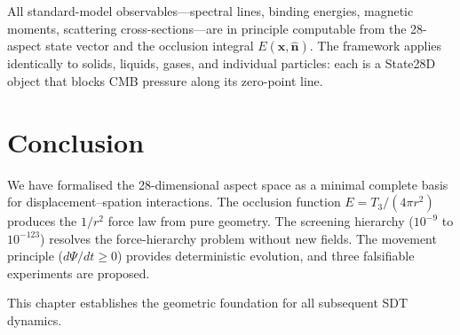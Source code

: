 All standard-model observables---spectral lines, binding energies, magnetic moments, scattering cross-sections---are in principle computable from the 28-aspect state vector and the occlusion integral $E(\mathbf{x},\hat{\mathbf{n}})$.  The framework applies identically to solids, liquids, gases, and individual particles: each is a State28D object that blocks CMB pressure along its zero-point line.


\section{Conclusion}

We have formalised the 28-dimensional aspect space as a minimal complete basis for displacement--spation interactions.  The occlusion function $E = T_3/(4\pi r^2)$ produces the $1/r^2$ force law from pure geometry.  The screening hierarchy ($10^{-9}$ to $10^{-123}$) resolves the force-hierarchy problem without new fields.  The movement principle ($d\Psi/dt \ge 0$) provides deterministic evolution, and three falsifiable experiments are proposed.

This chapter establishes the geometric foundation for all subsequent SDT dynamics.


